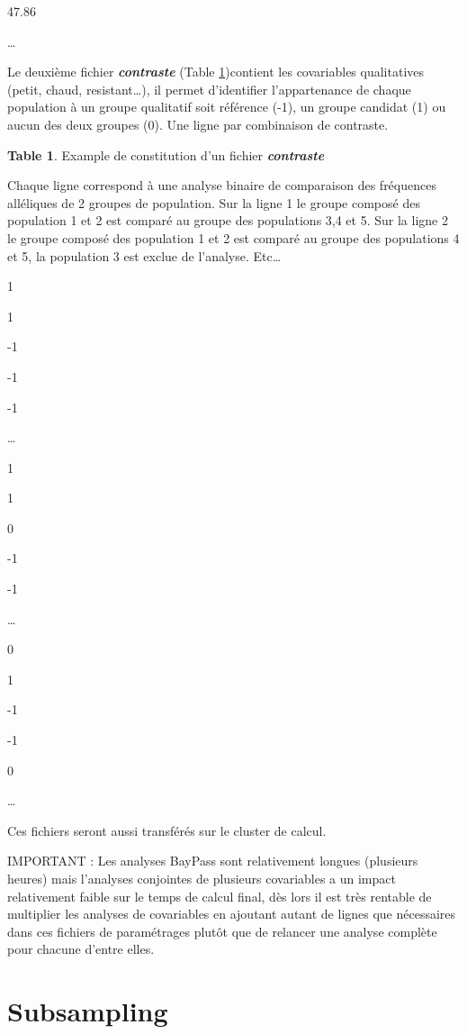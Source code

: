 \documentclass[
  openany]{book}
\theoremstyle{definition}
\newtheorem{definition}{Table}[chapter]
\theoremstyle{definition}
\theoremstyle{definition}
\theoremstyle{definition}
\theoremstyle{remark}
\begin{document}
47.86

\ldots{}

Le deuxième fichier \textbf{\emph{contraste}} (Table \ref{def:table2})contient les covariables qualitatives (petit, chaud, resistant\ldots), il permet d'identifier l'appartenance de chaque population à un groupe qualitatif soit référence (-1), un groupe candidat (1) ou aucun des deux groupes (0). Une ligne par combinaison de contraste.

\begin{definition}
\protect\hypertarget{def:table2}{}\label{def:table2}{Example de constitution d'un fichier \textbf{\emph{contraste}}}
\end{definition}

Chaque ligne correspond à une analyse binaire de comparaison des fréquences alléliques de 2 groupes de population.
Sur la ligne 1 le groupe composé des population 1 et 2 est comparé au groupe des populations 3,4 et 5.
Sur la ligne 2 le groupe composé des population 1 et 2 est comparé au groupe des populations 4 et 5, la population 3 est exclue de l'analyse.
Etc\ldots{}

1

1

-1

-1

-1

\ldots{}

1

1

0

-1

-1

\ldots{}

0

1

-1

-1

0

\ldots{}

Ces fichiers seront aussi transférés sur le cluster de calcul.

IMPORTANT : Les analyses BayPass sont relativement longues (plusieurs heures) mais l'analyses conjointes de plusieurs covariables a un impact relativement faible sur le temps de calcul final, dès lors il est très rentable de multiplier les analyses de covariables en ajoutant autant de lignes que nécessaires dans ces fichiers de paramétrages plutôt que de relancer une analyse complète pour chacune d'entre elles.

\hypertarget{subsampling}{%
\section*{Subsampling}\label{subsampling}}
\end{document}
